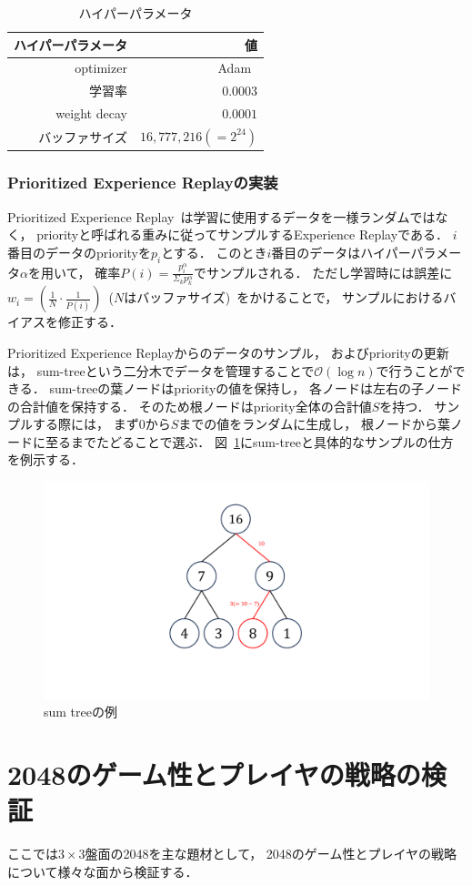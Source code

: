 \begin{table}[t]
\caption{ハイパーパラメータ}
\label{table:hyperparametr}
\centering
\begin{tabular}{r|r}
    \hline \hline
    ハイパーパラメータ & 値 \\ \hline
    optimizer & Adam~\cite{Adam} \\
    学習率 & $0.0003$ \\
    weight decay & $0.0001$ \\
    バッファサイズ & $16,777,216(=2^{24})$ \\
    \hline
\end{tabular}
\end{table}

\subsection{Prioritized Experience Replayの実装}
Prioritized Experience Replay~\cite{prioritized}は学習に使用するデータを一様ランダムではなく， priorityと呼ばれる重みに従ってサンプルするExperience Replayである．
$i$番目のデータのpriorityを$p_i$とする．
このとき$i$番目のデータはハイパーパラメータ$\alpha$を用いて， 確率$P(i) = \frac{p_{i}^{\alpha}}{\Sigma_k p_{k}^{\alpha}}$でサンプルされる．
ただし学習時には誤差に$w_i = (\frac{1}{N}\cdot \frac{1}{P(i)})$~($N$はバッファサイズ)~をかけることで， サンプルにおけるバイアスを修正する．

Prioritized Experience Replayからのデータのサンプル， およびpriorityの更新は， sum-treeという二分木でデータを管理することで$\mathcal{O}(\log n)$で行うことができる．
sum-treeの葉ノードはpriorityの値を保持し， 各ノードは左右の子ノードの合計値を保持する．
そのため根ノードはpriority全体の合計値$S$を持つ．
サンプルする際には， まず$0$から$S$までの値をランダムに生成し， 根ノードから葉ノードに至るまでたどることで選ぶ．
図~\ref{fig:sumtree}にsum-treeと具体的なサンプルの仕方を例示する．
\begin{figure}[t]
    \centering
    \includegraphics[width=0.4\linewidth{}]{figures/sumtree_.pdf}
    \caption{sum treeの例}
    \label{fig:sumtree}
\end{figure}

\chapter{2048のゲーム性とプレイヤの戦略の検証}
ここでは$3\times3$盤面の2048を主な題材として， 2048のゲーム性とプレイヤの戦略について様々な面から検証する．

